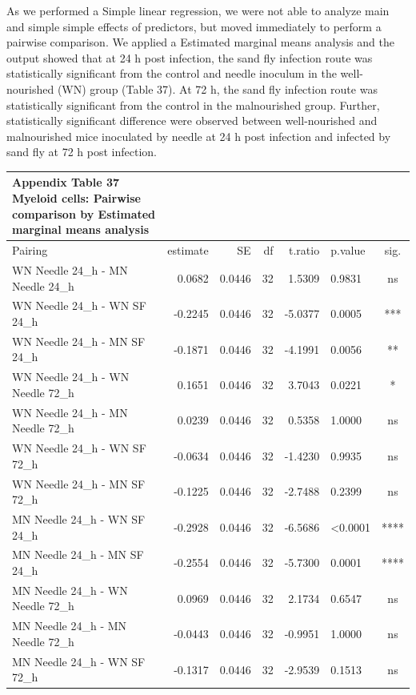 \documentclass[
  12pt,
  letterpaper,
]{article}
\begin{document}
As we performed a Simple linear regression, we were not able to analyze main and simple simple effects of predictors, but moved immediately to perform a pairwise comparison. We applied a Estimated marginal means analysis and the output showed that at 24 h post infection, the sand fly infection route was statistically significant from the control and needle inoculum in the well-nourished (WN) group (Table 37). At 72 h, the sand fly infection route was statistically significant from the control in the malnourished group. Further, statistically significant difference were observed between well-nourished and malnourished mice inoculated by needle at 24 h post infection and infected by sand fly at 72 h post infection.

\begin{longtable}{l|rrrrlc}
\caption*{
{\large \textbf{Appendix Table 37}} \\ 
{\small \textbf{Myeloid cells: Pairwise comparison by Estimated marginal means analysis}}
} \\ 
\toprule
\multicolumn{1}{l}{Pairing} & estimate & SE & df & t.ratio & p.value & sig. \\ 
\midrule\addlinespace[2.5pt]
WN Needle 24\_h - MN Needle 24\_h & 0.0682 & 0.0446 & 32 & 1.5309 & 0.9831 & ns \\ 
WN Needle 24\_h - WN SF 24\_h & -0.2245 & 0.0446 & 32 & -5.0377 & 0.0005 & *** \\ 
WN Needle 24\_h - MN SF 24\_h & -0.1871 & 0.0446 & 32 & -4.1991 & 0.0056 & ** \\ 
WN Needle 24\_h - WN Needle 72\_h & 0.1651 & 0.0446 & 32 & 3.7043 & 0.0221 & * \\ 
WN Needle 24\_h - MN Needle 72\_h & 0.0239 & 0.0446 & 32 & 0.5358 & 1.0000 & ns \\ 
WN Needle 24\_h - WN SF 72\_h & -0.0634 & 0.0446 & 32 & -1.4230 & 0.9935 & ns \\ 
WN Needle 24\_h - MN SF 72\_h & -0.1225 & 0.0446 & 32 & -2.7488 & 0.2399 & ns \\ 
MN Needle 24\_h - WN SF 24\_h & -0.2928 & 0.0446 & 32 & -6.5686 & <0.0001 & **** \\ 
MN Needle 24\_h - MN SF 24\_h & -0.2554 & 0.0446 & 32 & -5.7300 & 0.0001 & **** \\ 
MN Needle 24\_h - WN Needle 72\_h & 0.0969 & 0.0446 & 32 & 2.1734 & 0.6547 & ns \\ 
MN Needle 24\_h - MN Needle 72\_h & -0.0443 & 0.0446 & 32 & -0.9951 & 1.0000 & ns \\ 
MN Needle 24\_h - WN SF 72\_h & -0.1317 & 0.0446 & 32 & -2.9539 & 0.1513 & ns \\ 

\end{longtable}
\end{document}

